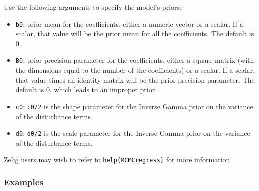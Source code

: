 Use the following arguments to specify the model's priors:  
\begin{itemize}
\item \texttt{b0}: prior mean for the coefficients, either a numeric
vector or a scalar. If a scalar, that value will
be the prior mean for all the coefficients. The default is 0.

\item \texttt{B0}: prior precision parameter for the coefficients,
either a square matrix (with the dimensions equal to the number of the
coefficients) or a scalar. If a scalar, that value times an identity
matrix will be the prior precision parameter. The default is 0, which
leads to an improper prior. 

\item \texttt{c0}: \texttt{c0/2} is the shape parameter for the Inverse Gamma
prior on the variance of the disturbance terms. 

\item \texttt{d0}: \texttt{d0/2} is the scale parameter for the Inverse Gamma
prior on the variance of the disturbance terms. 

\end{itemize}

Zelig users may wish to refer to \texttt{help(MCMCregress)} for more 
information.



\subsubsection{Examples}

